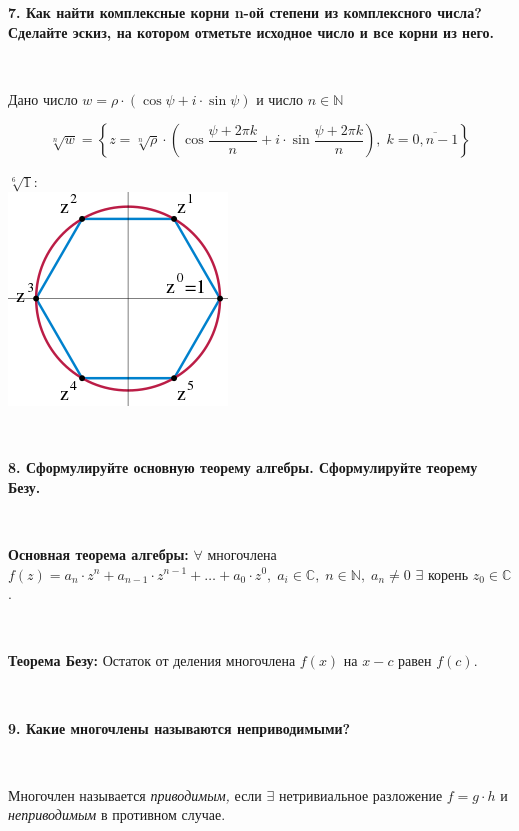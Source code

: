 \documentclass{article}
\begin{document}
    \newpage

    \textbf{7. Как найти комплексные корни n-ой степени из комплексного числа? Сделайте эскиз, на котором отметьте исходное число и все корни из него.}

    {
        $\;$
        \setlength{\parindent}{0.4cm}
        \hangindent=0.4cm

    Дано число $w=\rho\cdot(\cos\psi+i\cdot \sin\psi)$ и число $n\in\mathbb{N}$

        $$\sqrt[n]{w}=\left\{z=\sqrt[n]{\rho}\cdot\left(\cos\frac{\psi+2\pi k}{n}+i\cdot\sin\frac{\psi+2\pi k}{n}\right), \; k=\overline{0, n-1}\right\} $$

        $\sqrt[6]{1}:$ \\

    \includegraphics[scale=0.7]{korni2.png}

        $\;$
        \setlength{\parindent}{0cm}
        \hangindent=0cm
    }

    \textbf{8. Сформулируйте основную теорему алгебры. Сформулируйте теорему Безу.}

    {
        $\;$
        \setlength{\parindent}{0.4cm}
        \hangindent=0.4cm

    \textbf{Основная теорема алгебры:} $\forall$ многочлена $f(z)=a_n\cdot z^n+a_{n-1}\cdot z^{n-1}+\ldots+a_0\cdot z^0, \; a_i\in\mathbb{C}, \; n\in\mathbb{N}, \; a_n\ne0$ $\exists$ корень $z_0\in\mathbb{C}$.

        $\;$

        \textbf{Теорема Безу:} Остаток от деления многочлена $f(x)$ на $x-c$ равен $f(c)$.

        $\;$
        \setlength{\parindent}{0cm}
        \hangindent=0cm
    }



    \textbf{9. Какие многочлены называются неприводимыми?}

    {
        $\;$
        \setlength{\parindent}{0.4cm}
        \hangindent=0.4cm

    Многочлен называется \textit{приводимым,} если $\exists$ нетривиальное разложение $f=g\cdot h$ и \textit{неприводимым} в противном случае.

        $\;$
        \setlength{\parindent}{0cm}
        \hangindent=0cm
    }
\end{document}
